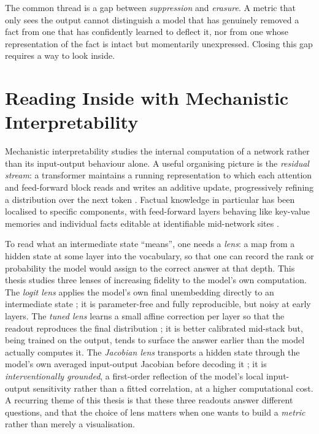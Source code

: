The common thread is a gap between \emph{suppression} and \emph{erasure}. A metric that only sees the output
cannot distinguish a model that has genuinely removed a fact from one that has confidently learned to
deflect it, nor from one whose representation of the fact is intact but momentarily unexpressed. Closing
this gap requires a way to look inside.

\section{Reading Inside with Mechanistic Interpretability}
\label{sec:mech-interp}

Mechanistic interpretability studies the internal computation of a network rather than its input-output
behaviour alone. A useful organising picture is the \emph{residual stream}: a transformer maintains a
running representation to which each attention and feed-forward block reads and writes an additive update,
progressively refining a distribution over the next token \citep{elhage2021framework}. Factual knowledge in
particular has been localised to specific components, with feed-forward layers behaving like key-value
memories \citep{geva2021kv} and individual facts editable at identifiable mid-network sites
\citep{meng2022rome}.

To read what an intermediate state ``means'', one needs a \emph{lens}: a map from a hidden state at some
layer into the vocabulary, so that one can record the rank or probability the model would assign to the
correct answer at that depth. This thesis studies three lenses of increasing fidelity to the model's own
computation. The \emph{logit lens} applies the model's own final unembedding directly to an intermediate
state \citep{nostalgebraist2020logitlens}; it is parameter-free and fully reproducible, but noisy at early
layers. The \emph{tuned lens} learns a small affine correction per layer so that the readout reproduces the
final distribution \citep{belrose2023tunedlens}; it is better calibrated mid-stack but, being trained on the
output, tends to surface the answer earlier than the model actually computes it. The \emph{Jacobian lens}
transports a hidden state through the model's own averaged input-output Jacobian before decoding it
\citep{anthropic2026workspace}; it is \emph{interventionally grounded}, a first-order reflection of the
model's local input-output sensitivity rather than a fitted correlation, at a higher computational cost. A recurring theme of this
thesis is that these three readouts answer different questions, and that the choice of lens matters when one
wants to build a \emph{metric} rather than merely a visualisation.

